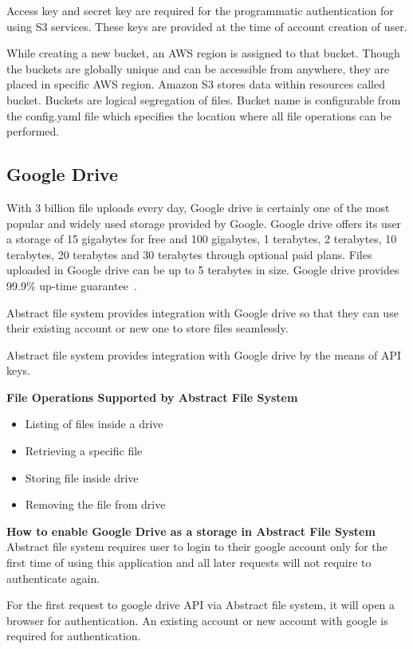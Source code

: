 Access key and secret key are required for the programmatic authentication for
using S3 services. These keys are provided at the time of account creation of
user.

While creating a new bucket, an AWS region is assigned to that bucket. Though
the buckets are globally unique and can be accessible from anywhere, they are
placed in specific AWS region.
Amazon S3 stores data within resources called bucket. Buckets are logical
segregation of files. Bucket name is configurable from the config.yaml file
which specifies the location where all file operations can be performed.


\subsection{Google Drive}

With 3 billion file uploads every day, Google drive is certainly one of the 
most popular and widely used storage provided by Google. Google drive offers 
its user a storage of 15 gigabytes for free and 100 gigabytes, 1 terabytes, 2 
terabytes, 10 terabytes, 20 terabytes and 30 terabytes through optional paid 
plans. Files uploaded in Google drive can be up to 5 terabytes in size. Google 
drive provides 99.9\% up-time guarantee~\cite{hid-sp18-420-google-drive-wiki}. 

Abstract file system provides integration with Google drive so that they can 
use their existing account or new one to store files seamlessly.

Abstract file system provides integration with Google drive by the means of 
API keys. 

\textbf{File Operations Supported by Abstract File System }
\begin{itemize}
    \item  Listing of files inside a drive
    \item  Retrieving a specific file 
    \item  Storing file inside drive
    \item  Removing the file from drive
\end{itemize}

\textbf{How to enable Google Drive as a storage in Abstract File System}
\\
Abstract file system requires user to login to their google account only for 
the first time of using this application and all later requests will not 
require to authenticate again. 

For the first request to google drive API via Abstract file system, it will 
open a browser for authentication. An existing account or new account with 
google is required for authentication. 

